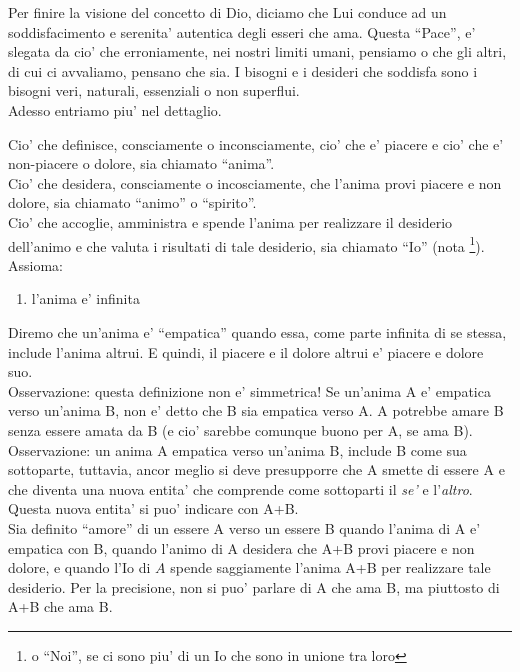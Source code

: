 Per finire la visione del concetto di Dio, diciamo che Lui conduce ad un soddisfacimento e serenita' autentica degli esseri che ama. Questa ``Pace'', e' slegata da cio' che erroniamente, nei nostri limiti umani, pensiamo o che gli altri, di cui ci avvaliamo, pensano che sia. I bisogni e i desideri che soddisfa sono i bisogni veri, naturali, essenziali o non superflui.\\

Adesso entriamo piu' nel dettaglio.

Cio' che definisce, consciamente o inconsciamente, cio' che e' piacere e cio' che e' non-piacere o dolore, sia chiamato ``anima''.\\
Cio' che desidera, consciamente o incosciamente, che l'anima provi piacere e non dolore, sia chiamato ``animo'' o ``spirito''.\\
Cio' che accoglie, amministra e spende l'anima per realizzare il desiderio dell'animo e che valuta i risultati di tale desiderio, sia chiamato ``Io'' (nota \footnote{o ``Noi'', se ci sono piu' di un Io che sono in unione tra loro}).\\

Assioma:
\begin{enumerate}
    \item l'anima e' infinita
\end{enumerate}

Diremo che un'anima e' ``empatica'' quando essa, come parte infinita di se stessa, include l'anima altrui. E quindi, il piacere e il dolore altrui e' piacere e dolore suo. \\
Osservazione: questa definizione non e' simmetrica! Se un'anima A e' empatica verso un'anima B, non e' detto che B sia empatica verso A. A potrebbe amare B senza essere amata da B (e cio' sarebbe comunque buono per A, se ama B). \\
Osservazione: un anima A empatica verso un'anima B, include B come sua sottoparte, tuttavia, ancor meglio si deve presupporre che A smette di essere A e che diventa una nuova entita' che comprende come sottoparti il \emph{se'} e l'\emph{altro}. Questa nuova entita' si puo' indicare con A+B. \\

Sia definito ``amore'' di un essere A verso un essere B quando l'anima di A e' empatica con B, quando l'animo di A desidera che A+B provi piacere e non dolore, e quando l'Io di $A$ spende saggiamente l'anima A+B per realizzare tale desiderio. Per la precisione, non si puo' parlare di A che ama B, ma piuttosto di A+B che ama B. 

